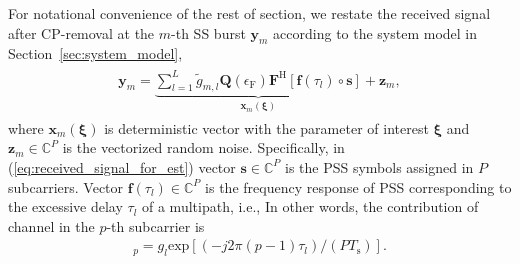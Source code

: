 \documentclass[journal]{IEEEtran}
\newcommand{\hermitian}[0]{\text{H}}
\newcommand{\CFO}[0]{\epsilon_{\text{F}}}
\newcommand{\Ts}[0]{T_{\text{s}}}
\begin{document}
For notational convenience of the rest of section, we restate the received signal after CP-removal at the $m$-th SS burst $\mathbf{y}_m$ according to the system model in Section~\ref{sec:system_model},
\begin{align}
\begin{split}
\mathbf{y}_m =\underbrace{\sum_{l=1}^{L} \tilde{g}_{m,l}\mathbf{Q}(\CFO)\mathbf{F}^{\hermitian}\left[\mathbf{f}(\tau_l)\circ \mathbf{s}\right]}_{\mathbf{x}_m(\boldsymbol{\xi})}+\mathbf{z}_m,
\end{split}
\label{eq:received_signal_for_est}
\end{align}
where $\mathbf{x}_m(\boldsymbol{\xi})$ is deterministic vector with the parameter of interest $\boldsymbol{\xi}$ and $\mathbf{z}_m\in\mathbb{C}^{P}$ is the vectorized random noise. 
%
Specifically, in (\ref{eq:received_signal_for_est}) vector $\mathbf{s}\in \mathbb{C}^{P}$ is the PSS symbols assigned in $P$ subcarriers. Vector $\mathbf{f}(\tau_l)\in\mathbb{C}^{P}$ is the frequency response
of PSS corresponding to the excessive delay $\tau_l$ of a multipath, i.e.,
In other words, the contribution of channel in the $p$-th subcarrier is
\begin{align}
[\mathbf{f}(\tau_l)]_p = g_l\mathrm{exp}\left[(-j2\pi (p-1)\tau_l)/(P\Ts)\right].
\label{eq:vector_f}
\end{align}
\end{document}
